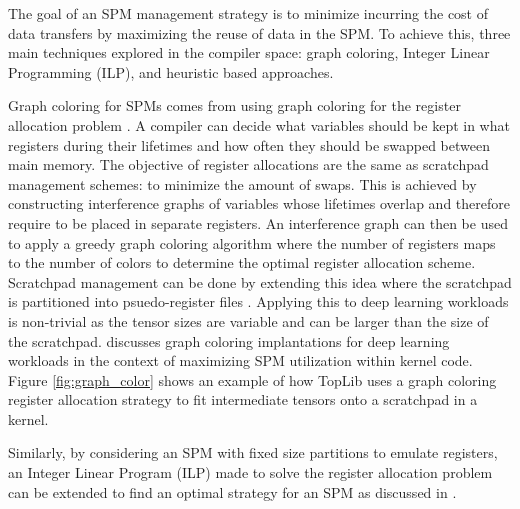 The goal of an SPM management strategy is to minimize incurring the cost of
data transfers by maximizing the reuse of data in the SPM. To achieve this,
three main techniques explored in the compiler space: graph coloring, Integer
Linear Programming (ILP), and heuristic based approaches.

Graph coloring for SPMs comes from using graph coloring for the register
allocation problem \cite{registerAllocation} \cite{graphColoring}. A compiler
can decide what variables should be kept in what registers during their
lifetimes and how often they should be swapped between main memory.  The
objective of register allocations are the same as scratchpad management
schemes: to minimize the amount of swaps. This is achieved by constructing
interference graphs of variables whose lifetimes overlap and therefore require
to be placed in separate registers. An interference graph can then be used to
apply a greedy graph coloring algorithm where the number of registers maps to
the number of colors to determine the optimal register allocation scheme.
Scratchpad management can be done by extending this idea where the scratchpad
is partitioned into psuedo-register files \cite{graphColoring}. Applying this
to deep learning workloads is non-trivial as the tensor sizes are variable and
can be larger than the size of the scratchpad. \cite{toplib} discusses graph
coloring implantations for deep learning workloads in the context of maximizing
SPM utilization within kernel code. Figure \ref{fig:graph_color} shows an example
of how TopLib \cite{toplib} uses a graph coloring register allocation strategy
to fit intermediate tensors onto a scratchpad in a kernel.

Similarly, by considering an SPM with fixed size partitions to emulate registers,
an Integer Linear Program (ILP) made to solve the register allocation problem can
be extended to find an optimal strategy for an SPM as discussed in \cite{verma}.

